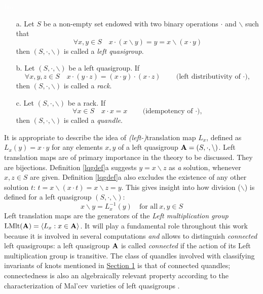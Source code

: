 \begin{definition}\textcolor{white}{line}

\begin{enumerate}\label{lqgdef}
    \item[a.] Let $S$ be a non-empty set endowed with two binary operations $\cdot$ and $\backslash$ such that \[\forall x,y \in S\quad x \cdot (x \backslash y ) = y = x \backslash (x \cdot y)\]then $(S, \cdot, \backslash)$ is called a \emph{left quasigroup}.  
\item[b.] Let $( S, \cdot, \backslash )$ be a left quasigroup. 
If 
\[\forall x,y,z \in S \quad x \cdot (y \cdot z) = (x \cdot y) \cdot (x \cdot z) \hspace{2em}\text{(left distributivity of $\cdot$),}\]
then $( S, \cdot, \backslash )$ is called a \emph{rack}.
\item[c.] Let $( S, \cdot, \backslash )$ be a rack.
If 
\[\forall x \in S \quad x \cdot x = x \hspace{2em}\text{(idempotency of $\cdot$),}\]
then $( S, \cdot, \backslash )$ is called a \emph{quandle}.
\end{enumerate}
\end{definition}
\noindent It is appropriate to describe the idea of  \emph{(left-)}translation map $L_x$, defined as $L_x(y) = x \cdot y$ for any elements $x,y$ of a left quasigroup $\mathbf{A} = (S, \cdot, \backslash)$. Left translation maps are of primary importance in the theory to be discussed. They are bijections. Definition \ref{lqgdef}a suggests $y=x\backslash z$ as \emph{a} solution, whenever $x,z\in S$ are given. Definition \ref{lqgdef}a also excludes the existence of any other solution $t$: $t = x \backslash (x \cdot t) = x \backslash z = y$.
\noindent This gives insight into how division ($\backslash$) is defined for a left quasigroup $(S, \cdot, \backslash)$: 
\[x\backslash y=L_x^{-1}(y)\quad\text{for all}~x,y \in S\]
\noindent Left translation maps are the generators of the \emph{Left multiplication group} \newline \label{leftmultiplicationgroup}$\operatorname{LMlt}(\mathbf{A}) = \langle L_x : x \in \mathbf{A} \rangle$.  It will play a fundamental role throughout this work because it is involved in several computations \emph{and} allows to distinguish \emph{connected} left quasigroups: a left quasigroup $\mathbf{A}$ is called \emph{connected} if the action of its Left multiplication group is transitive.
The class of quandles involved with classifying invariants of knots mentioned in \hyperref[intro1Connected]{Section 1} is that of connected quandles;  connectedness is also an algebraically relevant property according to the characterization of Mal’cev varieties of left quasigroups \cite{bonatto2021malcev}.

